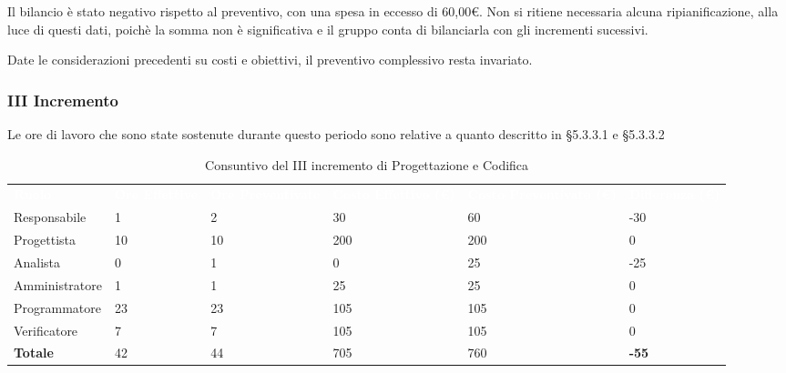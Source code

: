 Il bilancio è stato negativo rispetto al preventivo, con una spesa in eccesso di 60,00\euro. Non si ritiene necessaria alcuna ripianificazione, alla luce di questi dati, poichè la somma non è significativa e il gruppo conta di bilanciarla con gli incrementi sucessivi.

Date le considerazioni precedenti su costi e obiettivi, il preventivo complessivo resta invariato.

\pagebreak


\subsubsection{III Incremento}
Le ore di lavoro che sono state sostenute durante questo periodo sono relative a quanto descritto in §5.3.3.1 e §5.3.3.2

\begin{table}[H]
\begin{center}
\renewcommand{\arraystretch}{1.5}
\begin{tabular}{ m{}<{\centering}  m{}<{\centering} m{}<{\centering} m{}<{\centering} m{}<{\centering} m{}<{\centering}}
	\rowcolor{darkblue}
	\textcolor{white}{\textbf{Ruolo}} & \textcolor{white}{\textbf{Ore Effettive}} & \textcolor{white}{\textbf{Ore Preventivate}}&\textcolor{white}{\textbf{Costo Effettivo (\euro)}}&\textcolor{white}{\textbf{Costo Preventivato (\euro)}}&\textcolor{white}{\textbf{Differenza (\euro)}}\\ 

	Responsabile & 1 & 2 & 30 & 60 & -30 \\	
	
	Progettista & 10 & 10 & 200 & 200 & 0\\
	
	Analista & 0 & 1 & 0 & 25 & -25\\
	
	Amministratore & 1 & 1 & 25 & 25 & 0\\
	
	Programmatore & 23 & 23 & 105 & 105 & 0\\
	
	Verificatore & 7 & 7 & 105 & 105 & 0\\
	
	\textbf{Totale} & 42 & 44 & 705 & 760 & \textbf{-55} \\
	
\end{tabular}
\caption{Consuntivo del III incremento di Progettazione e Codifica}
\end{center}
\end{table}

